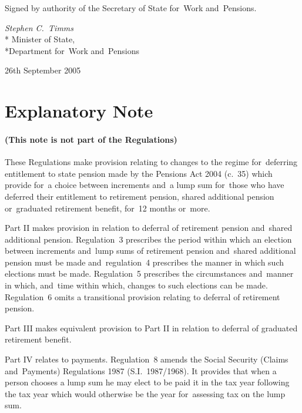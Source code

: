 \documentclass[12pt,a4paper]{article}
\begin{document}
\bigskip

Signed 
by authority of the 
Secretary of State for~Work and~Pensions.

{\raggedleft
\emph{Stephen C.~Timms}\\*
Minister
of State,\\*Department 
for~Work and~Pensions

}

26th September 2005

\small

\part{Explanatory Note}

\renewcommand\parthead{— Explanatory Note}

\subsection*{(This note is not part of the Regulations)}

These Regulations make provision relating to changes to the regime for~deferring entitlement to state pension made by the Pensions Act 2004 (c.~35) which provide for~a choice between increments and~a lump sum for~those who have deferred their entitlement to retirement pension, shared additional pension or~graduated retirement benefit, for~12 months or~more.

Part II makes provision in relation to deferral of retirement pension and~shared additional pension. Regulation~3 prescribes the period within which an election between increments and~lump sums of retirement pension and~shared additional pension must be made and~regulation~4 prescribes the manner in which such elections must be made. Regulation~5 prescribes the circumstances and~manner in which, and~time within which, changes to such elections can be made. Regulation~6 omits a transitional provision relating to deferral of retirement pension.

Part III makes equivalent provision to Part II in relation to deferral of graduated retirement benefit.

Part IV relates to payments. Regulation~8 amends the Social Security (Claims and~Payments) Regulations 1987 (S.I.~1987/1968). It provides that when a person chooses a lump sum he may elect to be paid it in the tax year following the tax year which would otherwise be the year for~assessing tax on the lump sum.
\end{document}
